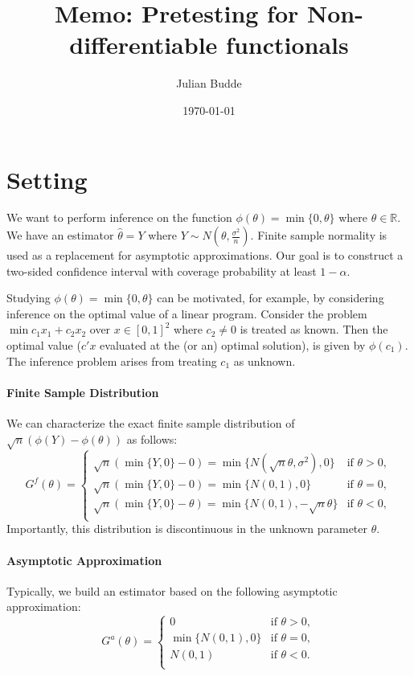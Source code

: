 \documentclass[12pt,a4paper,english]{article} %
\title{Memo: Pretesting for Non-differentiable functionals}
\author{Julian Budde}
\date{\today}
\numberwithin{equation}{section}
\theoremstyle{definition}
\theoremstyle{remark}
\theoremstyle{plain}
\begin{document}
\maketitle

\section{Setting}
We want to perform inference on the function $\phi(\theta) = \min\{0, \theta\}$ where $\theta \in \mathbb{R}$.
We have an estimator $\hat{\theta} = Y$ where $Y \sim N(\theta, \frac{\sigma^2}{n})$.
Finite sample normality is used as a replacement for asymptotic approximations.
Our goal is to construct a two-sided confidence interval with coverage probability at least $1-\alpha$.

Studying $\phi(\theta) = \min\{0, \theta\}$ can be motivated, for example, by considering inference on the optimal value of a linear program.
Consider the problem $\min c_1 x_1 + c_2 x_2$ over $x\in[0,1]^2$ where $c_2\neq0$ is treated as known.
Then the optimal value ($c'x$ evaluated at the (or an) optimal solution), is given by $\phi(c_1)$.
The inference problem arises from treating $c_1$ as unknown.

\paragraph{Finite Sample Distribution}
We can characterize the exact finite sample distribution of $\sqrt{n}(\phi(Y) - \phi(\theta))$ as follows:
\begin{equation}
  G^f(\theta)=
    \begin{cases}
      \sqrt{n}(\min\{Y, 0\} - 0) = \min\{N(\sqrt{n}\theta, \sigma^2), 0\}& \text{if } \theta > 0,\\
      \sqrt{n}(\min\{Y, 0\} - 0) = \min\{N(0,1), 0\}& \text{if } \theta = 0,\\
      \sqrt{n}(\min\{Y, 0\} - \theta) =\min\{N(0,1), -\sqrt{n}\theta\}& \text{if } \theta < 0,\\
  \end{cases}
\end{equation}
Importantly, this distribution is discontinuous in the unknown parameter $\theta$.

\paragraph{Asymptotic Approximation}
Typically, we build an estimator based on the following asymptotic approximation:
\begin{equation}
  G^a(\theta)=
    \begin{cases}
      0 & \text{if } \theta > 0,\\
      \min\{N(0,1), 0\}& \text{if } \theta = 0,\\
      N(0,1)& \text{if } \theta < 0.\\
  \end{cases}
\end{equation}
\end{document}
